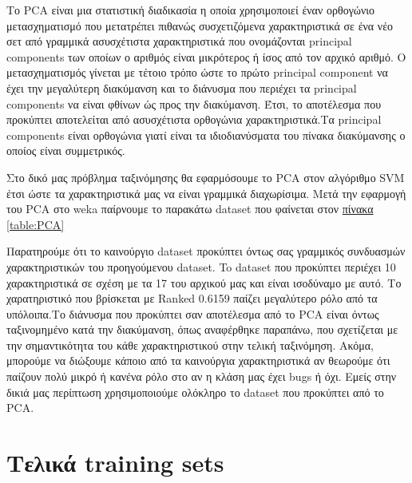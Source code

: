 Το PCA είναι μια στατιστική διαδικασία η οποία χρησιμοποιεί έναν ορθογώνιο μετασχηματισμό που μετατρέπει πιθανώς συσχετιζόμενα χαρακτηριστικά σε ένα νέο σετ από γραμμικά ασυσχέτιστα χαρακτηριστικά που ονομάζονται principal components των οποίων ο αριθμός είναι μικρότερος ή ίσος από τον αρχικό αριθμό.
Ο μετασχηματισμός γίνεται με τέτοιο τρόπο ώστε το πρώτο principal component να έχει την μεγαλύτερη διακύμανση και το διάνυσμα που περιέχει τα principal components να είναι φθίνων ώς προς την διακύμανση.
Έτσι, το αποτέλεσμα που προκύπτει αποτελείται από ασυσχέτιστα ορθογώνια χαρακτηριστικά.Τα principal components είναι ορθογώνια γιατί είναι τα ιδιοδιανύσματα του πίνακα διακύμανσης ο οποίος είναι συμμετρικός.

Στο δικό μας πρόβλημα ταξινόμησης θα εφαρμόσουμε το PCA στον αλγόριθμο SVM έτσι ώστε τα χαρακτηριστικά μας να είναι γραμμικά διαχωρίσιμα.
Μετά την εφαρμογή του PCA στο weka παίρνουμε το παρακάτω dataset που φαίνεται στον
\hyperref[table:PCA]{πίνακα \ref{table:PCA}}

Παρατηρούμε ότι το καινούργιο dataset προκύπτει όντως σας γραμμικός συνδυασμών χαρακτηριστικών του προηγούμενου dataset.
To dataset που προκύπτει περιέχει 10 χαρακτηριστικά σε σχέση με τα 17 του αρχικού μας και είναι ισοδύναμο με αυτό.
Το χαρατηριστικό που βρίσκεται με Ranked 0.6159 παίζει μεγαλύτερο ρόλο από τα υπόλοιπα.Το διάνυσμα που προκύπτει σαν αποτέλεσμα από το PCA είναι όντως ταξινομημένο κατά την διακύμανση,
όπως αναφέρθηκε παραπάνω,
που σχετίζεται με την σημαντικότητα του κάθε χαρακτηριστικού στην τελική ταξινόμηση.
Ακόμα, μπορούμε να διώξουμε κάποιο από τα καινούργια χαρακτηριστικά αν θεωρούμε ότι παίζουν πολύ μικρό ή κανένα ρόλο στο αν η κλάση μας έχει bugs ή όχι.
Εμείς στην δικιά μας περίπτωση χρησιμοποιούμε ολόκληρο το dataset που προκύπτει από το PCA.
 
\FloatBarrier
\section{Τελικά training sets}